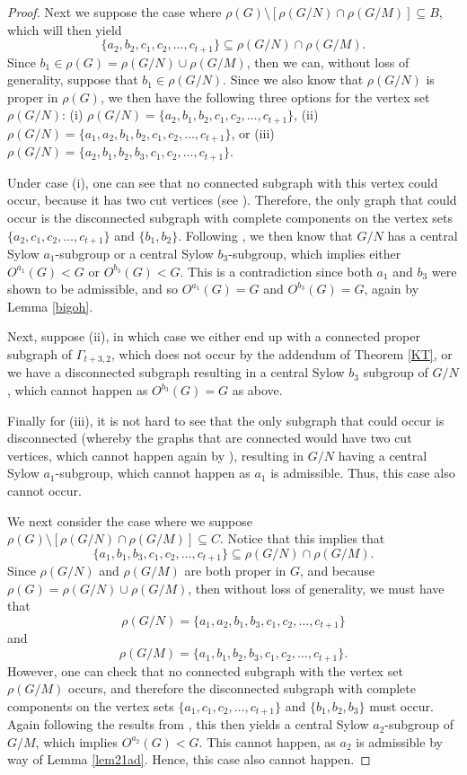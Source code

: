 \documentclass[11pt]{amsart}
\theoremstyle{definition}
\theoremstyle{remark}
\numberwithin{equation}{section}
\begin{document}
\begin{proof}
Next we suppose the case where $\rho(G)\setminus[\rho(G/N)\cap\rho(G/M)]\subseteq B$, which will then yield
$$
\{a_2,b_2,c_1,c_2,\ldots,c_{t+1}\}\subseteq\rho(G/N)\cap\rho(G/M).
$$
Since $b_1\in\rho(G)=\rho(G/N)\cup\rho(G/M)$, then we can, without loss of generality, suppose that $b_1\in\rho(G/N)$. Since we also know that $\rho(G/N)$ is proper in $\rho(G)$, we then have the following three options for the vertex set $\rho(G/N)$: (i) $\rho(G/N)=\{a_2,b_1,b_2,c_1,c_2,\ldots,c_{t+1}\}$, (ii) $\rho(G/N)=\{a_1,a_2,b_1,b_2,c_1,c_2,\ldots,c_{t+1}\}$, or (iii) $\rho(G/N)=\{a_2,b_1,b_2,b_3,c_1,c_2,\ldots,c_{t+1}\}$.

Under case (i), one can see that no connected subgraph with this vertex could occur, because it has two cut vertices (see \cite{MQ}). Therefore, the only graph that could occur is the disconnected subgraph with complete components on the vertex sets $\{a_2,c_1,c_2,\ldots,c_{t+1}\}$ and $\{b_1,b_2\}$. Following \cite{L}, we then know that $G/N$ has a central Sylow $a_1$-subgroup or a central Sylow $b_3$-subgroup, which implies either $O^{a_1}(G)<G$ or $O^{b_3}(G)<G$. This is a contradiction since both $a_1$ and $b_3$ were shown to be admissible, and so $O^{a_1}(G)=G$ and $O^{b_3}(G)=G$, again by Lemma \ref{bigoh}.

Next, suppose (ii), in which case we either end up with a connected proper subgraph of $\Gamma_{t+3,2}$, which does not occur by the addendum of Theorem \ref{KT}, or we have a disconnected subgraph resulting in a central Sylow $b_3$ subgroup of $G/N$, which cannot happen as $O^{b_3}(G)=G$ as above.

Finally for (iii), it is not hard to see that the only subgraph that could occur is disconnected (whereby the graphs that are connected would have two cut vertices, which cannot happen again by \cite{MQ}), resulting in $G/N$ having a central Sylow $a_1$-subgroup, which cannot happen as $a_1$ is admissible. Thus, this case also cannot occur.

We next consider the case where we suppose $\rho(G)\setminus[\rho(G/N)\cap\rho(G/M)]\subseteq C$. Notice that this implies that
$$
\{a_1,b_1,b_3,c_1,c_2,\ldots,c_{t+1}\}\subseteq\rho(G/N)\cap\rho(G/M).
$$
Since $\rho(G/N)$ and $\rho(G/M)$ are both proper in $G$, and because $\rho(G)=\rho(G/N)\cup\rho(G/M)$, then without loss of generality, we must have that
$$
\rho(G/N)=\{a_1,a_2,b_1,b_3,c_1,c_2,\ldots,c_{t+1}\}
$$
and
$$
\rho(G/M)=\{a_1,b_1,b_2,b_3,c_1,c_2,\ldots,c_{t+1}\}.
$$
However, one can check that no connected subgraph with the vertex set $\rho(G/M)$ occurs, and therefore the disconnected subgraph with complete components on the vertex sets $\{a_1,c_1,c_2,\ldots,c_{t+1}\}$ and $\{b_1,b_2,b_3\}$ must occur. Again following the results from \cite{L}, this then yields a central Sylow $a_2$-subgroup of $G/M$, which implies $O^{a_2}(G)<G$. This cannot happen, as $a_2$ is admissible by way of Lemma \ref{lem21ad}. Hence, this case also cannot happen.


\end{proof}
\end{document}

